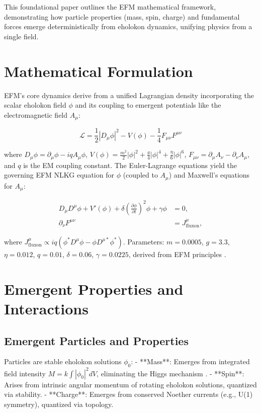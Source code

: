 \documentclass[11pt]{article}
\begin{document}
This foundational paper outlines the EFM mathematical framework, demonstrating how particle properties (mass, spin, charge) and fundamental forces emerge deterministically from eholokon dynamics, unifying physics from a single field.

\section{Mathematical Formulation}
EFM’s core dynamics derive from a unified Lagrangian density incorporating the scalar eholokon field \(\phi\) and its coupling to emergent potentials like the electromagnetic field \(A_\mu\):

\begin{equation}
\mathcal{L} = \frac{1}{2} |D_\mu \phi|^2 - V(\phi) - \frac{1}{4} F_{\mu \nu} F^{\mu \nu}
\end{equation}

where \(D_\mu \phi = \partial_\mu \phi - i q A_\mu \phi\), \(V(\phi) = \frac{m^2}{2} |\phi|^2 + \frac{g}{4} |\phi|^4 + \frac{\eta}{6} |\phi|^6\), \(F_{\mu \nu} = \partial_\mu A_\nu - \partial_\nu A_\mu\), and \(q\) is the EM coupling constant. The Euler-Lagrange equations yield the governing EFM NLKG equation for \(\phi\) (coupled to \(A_\mu\)) and Maxwell’s equations for \(A_\mu\):

\begin{equation}
\begin{aligned}
D_\mu D^\mu \phi + V'(\phi) + \delta \left(\frac{\partial \phi}{\partial t}\right)^2 \phi + \gamma \phi &= 0, \\
\partial_\nu F^{\mu \nu} &= J_{\text{fluxon}}^\mu,
\end{aligned}
\end{equation}

where \(J_{\text{fluxon}}^\mu \propto i q (\phi^* D^\mu \phi - \phi D^{\mu *} \phi^*)\). Parameters: \(m = 0.0005\), \(g = 3.3\), \(\eta = 0.012\), \(q = 0.01\), \(\delta = 0.06\), \(\gamma = 0.0225\), derived from EFM principles \citep{emvula2025compendium}.

\section{Emergent Properties and Interactions}
\subsection{Emergent Particles and Properties}
Particles are stable eholokon solutions \(\phi_0\):
- **Mass**: Emerges from integrated field intensity \(M = k \int |\phi_0|^2 dV\), eliminating the Higgs mechanism \citep{emvula2025particles}.
- **Spin**: Arises from intrinsic angular momentum of rotating eholokon solutions, quantized via stability.
- **Charge**: Emerges from conserved Noether currents (e.g., U(1) symmetry), quantized via topology.
\end{document}
